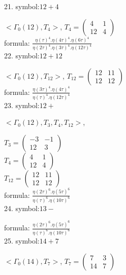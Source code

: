 21. symbol:$ 12+4 $

$ < \Gamma_0 ( 12 ), T_{4} >  $,
$
T_{4} = 
\left(
\begin{array}{cc}
4 & 1 \\
12 & 4
\end{array}
\right)
$
\\

formula: 
$ \frac{\eta(\tau)^4 . \eta(4\tau)^4. \eta(6\tau)^4}{\eta(2\tau)^4 . \eta(3\tau)^4. \eta(12\tau)^4} $
\\

22. symbol:$ 12+12 $

$ < \Gamma_0 ( 12 ), T_{12} >  $,
$
T_{12} = 
\left(
\begin{array}{cc}
12 & 11 \\
12 & 12
\end{array}
\right)
$
\\

formula: 
$ \frac{\eta(3\tau)^4 . \eta(4\tau)^4}{\eta(\tau)^4 . \eta(12\tau)^4} $
\\

23. symbol:$ 12+ $

$ < \Gamma_0 ( 12 ), T_{3}, T_{4}, T_{12} >  $,

$
T_{3} = 
\left(
\begin{array}{cc}
-3 & -1 \\
12 & 3
\end{array}
\right)
$
\\
$
T_{4} = 
\left(
\begin{array}{cc}
4 & 1 \\
12 & 4
\end{array}
\right)
$
\\
$
T_{12} = 
\left(
\begin{array}{cc}
12 & 11 \\
12 & 12
\end{array}
\right)
$
\\

formula: 
$ \frac{\eta(2\tau)^6 . \eta(5\tau)^6}{\eta(\tau)^6 . \eta(10\tau)^6} $
\\

24. symbol:$ 13- $

formula: 
$ \frac{\eta(2\tau)^6 . \eta(5\tau)^6}{\eta(\tau)^6 . \eta(10\tau)^6} $
\\

25. symbol:$ 14+7 $

$ < \Gamma_0 ( 14 ), T_{7} >  $,
$
T_{7} = 
\left(
\begin{array}{cc}
7 & 3 \\
14 & 7
\end{array}
\right)
$
\\


